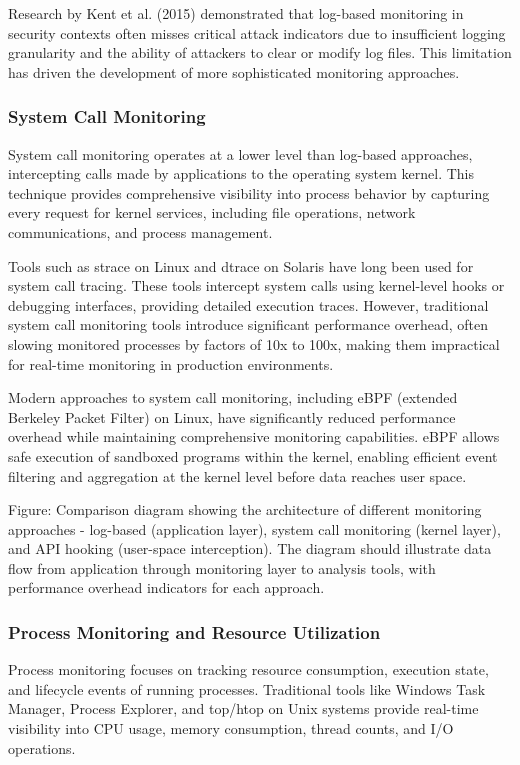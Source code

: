 Research by Kent et al. (2015) demonstrated that log-based monitoring in security contexts often misses critical attack indicators due to insufficient logging granularity and the ability of attackers to clear or modify log files. This limitation has driven the development of more sophisticated monitoring approaches.

\subsubsection{System Call Monitoring}
System call monitoring operates at a lower level than log-based approaches, intercepting calls made by applications to the operating system kernel. This technique provides comprehensive visibility into process behavior by capturing every request for kernel services, including file operations, network communications, and process management.

Tools such as strace on Linux and dtrace on Solaris have long been used for system call tracing. These tools intercept system calls using kernel-level hooks or debugging interfaces, providing detailed execution traces. However, traditional system call monitoring tools introduce significant performance overhead, often slowing monitored processes by factors of 10x to 100x, making them impractical for real-time monitoring in production environments.

Modern approaches to system call monitoring, including eBPF (extended Berkeley Packet Filter) on Linux, have significantly reduced performance overhead while maintaining comprehensive monitoring capabilities. eBPF allows safe execution of sandboxed programs within the kernel, enabling efficient event filtering and aggregation at the kernel level before data reaches user space.

{{Figure: Comparison diagram showing the architecture of different monitoring approaches - log-based (application layer), system call monitoring (kernel layer), and API hooking (user-space interception). The diagram should illustrate data flow from application through monitoring layer to analysis tools, with performance overhead indicators for each approach.}}

\subsubsection{Process Monitoring and Resource Utilization}
Process monitoring focuses on tracking resource consumption, execution state, and lifecycle events of running processes. Traditional tools like Windows Task Manager, Process Explorer, and top/htop on Unix systems provide real-time visibility into CPU usage, memory consumption, thread counts, and I/O operations.

